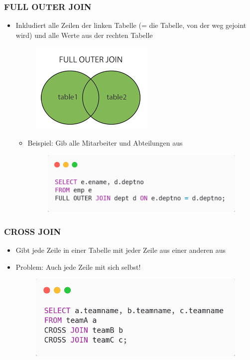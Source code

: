 \subsubsection{FULL OUTER JOIN}
\begin{itemize}
    \item Inkludiert alle Zeilen der linken Tabelle (= die Tabelle, von der weg gejoint wird) und alle Werte aus der rechten Tabelle
    \begin{figure}[H]
        \centering
        \includegraphics{res/themenkorb_2/joins_full_outer_join.png} 
    \end{figure}
    \begin{itemize}
        \item Beispiel: Gib alle Mitarbeiter und Abteilungen aus
        \begin{figure}[H]
            \centering 
            \includegraphics[scale=.45]{res/themenkorb_2/joins_full_outer_join_example.png}
        \end{figure}
    \end{itemize}
\end{itemize}

\subsubsection{CROSS JOIN}
\begin{itemize}
    \item Gibt jede Zeile in einer Tabelle mit jeder Zeile aus einer anderen aus
    \item Problem: Auch jede Zeile mit sich selbst!
    \begin{figure}[H]
        \centering
        \includegraphics[scale=.4]{res/themenkorb_2/cross_join.png} 
    \end{figure}
\end{itemize}

